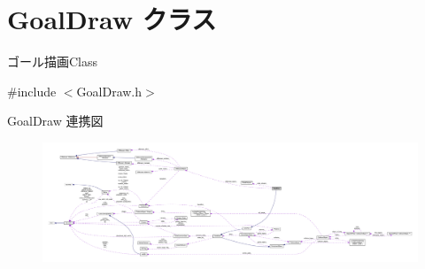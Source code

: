 \hypertarget{class_goal_draw}{}\section{Goal\+Draw クラス}
\label{class_goal_draw}


ゴール描画\+Class  




{\ttfamily \#include $<$Goal\+Draw.\+h$>$}



Goal\+Draw 連携図\nopagebreak
\begin{figure}[H]
\begin{center}
\leavevmode
\includegraphics[width=350pt]{class_goal_draw__coll__graph}
\end{center}
\end{figure}
